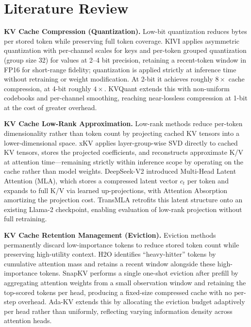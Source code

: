 \documentclass[conference]{IEEEtran}
\begin{document}
\section{Literature Review}

\textbf{KV Cache Compression (Quantization).}
Low-bit quantization reduces bytes per stored token while preserving
full token coverage.  KIVI \cite{kivi} applies asymmetric quantization
with per-channel scales for keys and per-token grouped quantization
(group size 32) for values at 2--4 bit precision, retaining a
recent-token window in FP16 for short-range fidelity; quantization is
applied strictly at inference time without retraining or weight
modification.  At 2-bit it achieves roughly $8\times$ cache
compression, at 4-bit roughly $4\times$.  KVQuant \cite{kvquant}
extends this with non-uniform codebooks and per-channel smoothing,
reaching near-lossless compression at 1-bit at the cost of greater
overhead.

\textbf{KV Cache Low-Rank Approximation.}
Low-rank methods reduce per-token dimensionality rather than token
count by projecting cached KV tensors into a lower-dimensional space.
xKV \cite{xkv} applies layer-group-wise SVD directly to cached KV
tensors, stores the projected coefficients, and reconstructs
approximate K/V at attention time---remaining strictly within
inference scope by operating on the cache rather than model weights.
DeepSeek-V2 \cite{deepseekv2} introduced Multi-Head Latent Attention
(MLA), which stores a compressed latent vector $c_t$ per token and
expands to full K/V via learned up-projections, with Attention
Absorption amortizing the projection cost.  TransMLA \cite{transmla}
retrofits this latent structure onto an existing Llama-2 checkpoint,
enabling evaluation of low-rank projection without full retraining.

\textbf{KV Cache Retention Management (Eviction).}
Eviction methods permanently discard low-importance tokens to reduce
stored token count while preserving high-utility context.  H2O
\cite{h2o} identifies ``heavy-hitter'' tokens by cumulative attention
mass and retains a recent window alongside these high-importance
tokens.  SnapKV \cite{snapkv} performs a single one-shot eviction
after prefill by aggregating attention weights from a small
observation window and retaining the top-scored tokens per head,
producing a fixed-size compressed cache with no per-step overhead.
Ada-KV \cite{adakv} extends this by allocating the eviction budget
adaptively per head rather than uniformly, reflecting varying
information density across attention heads.
\end{document}
